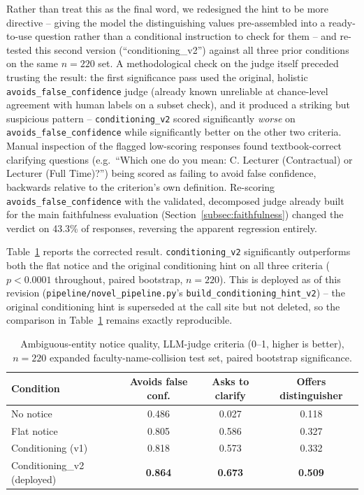 \documentclass[a4paper,twoside]{article}
\begin{document}
Rather than treat this as the final word, we redesigned the hint to be more directive -- giving the model the distinguishing values pre-assembled into a ready-to-use question rather than a conditional instruction to check for them -- and re-tested this second version (``conditioning\_v2'') against all three prior conditions on the same $n=220$ set. A methodological check on the judge itself preceded trusting the result: the first significance pass used the original, holistic \texttt{avoids\_false\_confidence} judge (already known unreliable at chance-level agreement with human labels on a subset check), and it produced a striking but suspicious pattern -- \texttt{conditioning\_v2} scored significantly \emph{worse} on \texttt{avoids\_false\_confidence} while significantly better on the other two criteria. Manual inspection of the flagged low-scoring responses found textbook-correct clarifying questions (e.g.\ ``Which one do you mean: C. Lecturer (Contractual) or Lecturer (Full Time)?'') being scored as failing to avoid false confidence, backwards relative to the criterion's own definition. Re-scoring \texttt{avoids\_false\_confidence} with the validated, decomposed judge already built for the main faithfulness evaluation (Section~\ref{subsec:faithfulness}) changed the verdict on 43.3\% of responses, reversing the apparent regression entirely.

Table~\ref{tab:conditioning-v2} reports the corrected result. \texttt{conditioning\_v2} significantly outperforms both the flat notice and the original conditioning hint on all three criteria ($p<0.0001$ throughout, paired bootstrap, $n=220$). This is deployed as of this revision (\texttt{pipeline/novel\_pipeline.py}'s \texttt{build\_conditioning\_hint\_v2}) -- the original conditioning hint is superseded at the call site but not deleted, so the comparison in Table~\ref{tab:conditioning-v2} remains exactly reproducible.

\begin{table}[t]
\caption{Ambiguous-entity notice quality, LLM-judge criteria (0--1, higher is better), $n=220$ expanded faculty-name-collision test set, paired bootstrap significance.}\label{tab:conditioning-v2} \centering
\begin{tabular}{|l|c|c|c|}
\hline
Condition & Avoids false conf. & Asks to clarify & Offers distinguisher \\
\hline
No notice & 0.486 & 0.027 & 0.118 \\
Flat notice & 0.805 & 0.586 & 0.327 \\
Conditioning (v1) & 0.818 & 0.573 & 0.332 \\
Conditioning\_v2 (deployed) & \textbf{0.864} & \textbf{0.673} & \textbf{0.509} \\
\hline
\end{tabular}
\end{table}
\end{document}
